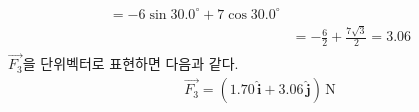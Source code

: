 \documentclass[floatfix,nofootinbib,superscriptaddress,fleqn,preprint]{revtex4}
\begin{document}
\begin{itemize}
\begin{align}
\begin{split}
      =-6\sin{30.0^\circ}+7\cos{30.0^\circ}   \\
      &=-\frac{6}{2}+\frac{7\sqrt{3}}{2} = 3.06
    \end{split}
  \end{align}
  $\vec{F_3}$을 단위벡터로 표현하면 다음과 같다.
  \begin{align}\label{eq:2}
    \vec{F_3}=(1.70\,\hat{\bm{i}} +
    3.06\,\hat{\bm{j}})\,\mathrm{N}
  \end{align}

\end{itemize}
\end{document}
